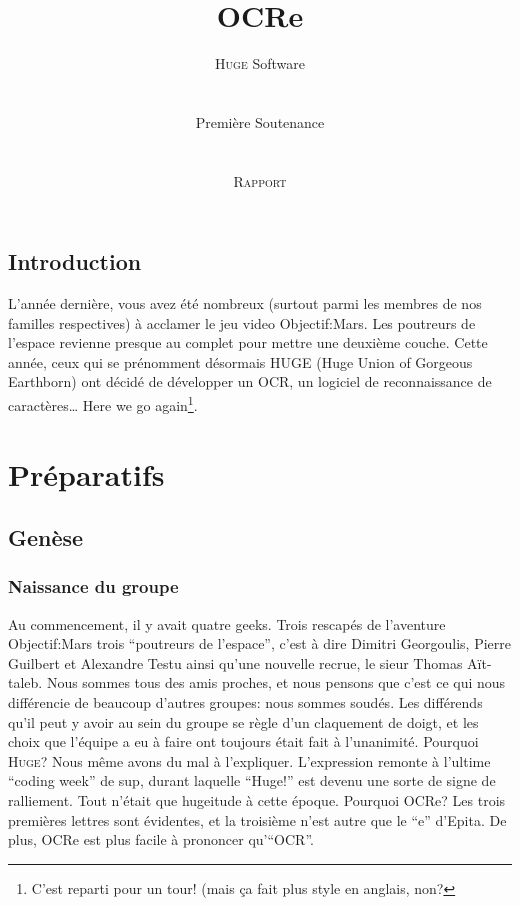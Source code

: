 \documentclass[]{report}
\title{OCRe}
\author{ \textsc{Huge} Software \\
\\
\\
Premi\`ere Soutenance \\
\\
\\
\textsc{Rapport}}
\date{}
\begin{document}
\ifpdf {} \else {} \fi

\maketitle

\pagebreak

\tableofcontents
\pagebreak

\chapter{Introduction}
L'ann\'ee derni\`ere, vous avez \'et\'e nombreux (surtout parmi les membres de nos familles respectives) \`a acclamer le jeu video Objectif:Mars. Les poutreurs de l'espace revienne presque au complet pour mettre une deuxi\`eme couche. Cette ann\'ee, ceux qui se pr\'enomment d\'esormais HUGE (Huge Union of Gorgeous Earthborn) ont d\'ecid\'e de d\'evelopper un OCR, un logiciel de reconnaissance de caract\`eres\ldots
Here we go again\footnote{C'est reparti pour un tour! (mais \c ca fait plus style en anglais, non?}.  

\part{Pr\'eparatifs}

\label{prt:preparatifs}

\chapter{Gen\`ese} %
\label{cha:genese}
	\section{Naissance du groupe} %
	\label{sec:naissance_du_groupe}
		Au commencement, il y avait quatre geeks. Trois rescap\'es de l'aventure Objectif:Mars trois ``poutreurs de l'espace'', c'est \`a dire Dimitri Georgoulis, Pierre Guilbert et Alexandre Testu ainsi qu'une nouvelle recrue, le sieur Thomas A\"it-taleb. Nous sommes tous des amis proches, et nous pensons que c'est ce qui nous diff\'erencie de beaucoup d'autres groupes: nous sommes soud\'es. Les diff\'erends qu'il peut y avoir au sein du groupe se r\`egle d'un claquement de doigt, et les choix que l'\'equipe a eu \`a faire ont toujours \'etait fait \`a l'unanimit\'e.
		\label{par:huge_ocre_}
			Pourquoi \textsc{Huge}? Nous m\^eme avons du mal \`a l'expliquer. L'expression remonte \`a l'ultime ``coding week'' de sup, durant laquelle ``Huge!'' est devenu une sorte de signe de ralliement. Tout n'\'etait que hugeitude \`a cette \'epoque.
			Pourquoi OCRe? Les trois premi\`eres lettres sont \'evidentes, et la troisi\`eme n'est autre que le ``e'' d'Epita. De plus, OCRe est plus facile \`a prononcer qu'``OCR''.
\end{document}
